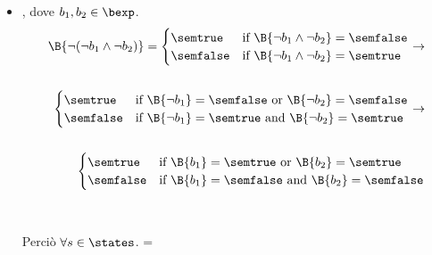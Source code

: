 {\begin{enumerate}[label=\alph*)]
\begin{itemize}
    \item {}, dove $b_1, b_2 \in \bexp$. \\
      \begin{align*}
        \B{\lnot (\lnot b_1 \land \lnot b_2)} =
        \begin{cases}
        \semtrue &
        \mbox{if} \ \B{\lnot b_1 \land \lnot b_2} = \semfalse \\
        \semfalse &
        \mbox{if} \ \B{\lnot b_1 \land \lnot b_2} = \semtrue \\
        \end{cases}
        \rightarrow \\ \\
        \begin{cases}
        \semtrue &
        \mbox{if} \ \B {\lnot b_1} = \semfalse
                    \mbox{ or }
                    \B {\lnot b_2} = \semfalse \\
        \semfalse &
        \mbox{if} \ \B{\lnot b_1} = \semtrue
                    \mbox{ and }
                    \B{\lnot b_2} = \semtrue \\
        \end{cases}
        \rightarrow \\ \\
        \begin{cases}
        \semtrue &
        \mbox{if} \ \B {b_1} = \semtrue
                    \mbox{ or }
                    \B {b_2} = \semtrue \\
        \semfalse &
        \mbox{if} \ \B{b_1} = \semfalse
                    \mbox{ and }
                    \B{b_2} = \semfalse \\
        \end{cases}
      \end{align*} \\ \\
      Perciò $\forall s \in \states$. =
       \\


\end{itemize}
\end{enumerate}}
